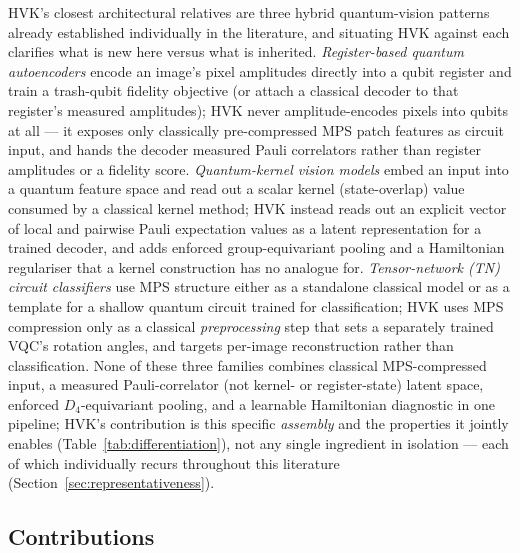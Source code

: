 \documentclass[pdflatex,sn-basic]{sn-jnl}
\begin{document}
HVK's closest architectural relatives are three hybrid quantum-vision patterns
already established individually in the literature, and situating HVK against
each clarifies what is new here versus what is inherited.
\emph{Register-based quantum autoencoders}
\citep{Romero2017, WangQAECompression2024, QAEClassification2025} encode an
image's pixel amplitudes directly into a qubit register and train a trash-qubit
fidelity objective (or attach a classical decoder to that register's measured
amplitudes); HVK never amplitude-encodes pixels into qubits at all --- it
exposes only classically pre-compressed MPS patch features as circuit input, and
hands the decoder measured Pauli correlators rather than register amplitudes or a
fidelity score. \emph{Quantum-kernel vision models}
\citep{Havlicek2019, QuantumKernelDefect2022} embed an input into a quantum
feature space and read out a scalar kernel (state-overlap) value consumed by a
classical kernel method; HVK instead reads out an explicit vector of local and
pairwise Pauli expectation values as a latent representation for a trained
decoder, and adds enforced group-equivariant pooling and a Hamiltonian
regulariser that a kernel construction has no analogue for.
\emph{Tensor-network (TN) circuit classifiers}
\citep{Guala2023, Stoudenmire2016, Han2018} use MPS structure either as a
standalone classical model or as a template for a shallow quantum circuit trained
for classification; HVK uses MPS compression only as a classical
\emph{preprocessing} step that sets a separately trained VQC's rotation angles,
and targets per-image reconstruction rather than classification. None of these
three families combines classical MPS-compressed input, a measured
Pauli-correlator (not kernel- or register-state) latent space, enforced
$D_4$-equivariant pooling, and a learnable Hamiltonian diagnostic in one
pipeline; HVK's contribution is this specific \emph{assembly} and the properties
it jointly enables (Table~\ref{tab:differentiation}), not any single ingredient in
isolation --- each of which individually recurs throughout this literature
(Section~\ref{sec:representativeness}).

\subsection*{Contributions}
\end{document}

